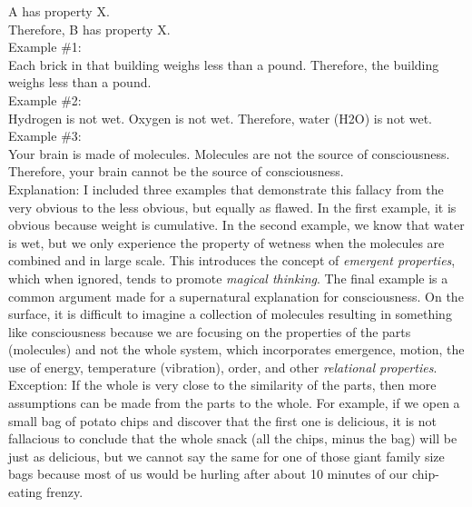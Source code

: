 \documentclass[a4paper,12pt,single,pdftex]{scrartcl}
\begin{document}
    
      A has property X.
    \\

    
      Therefore, B has property X.
    \\

    
      Example \#1:
    \\

    
      Each brick in that building weighs less than a pound.  Therefore, the building weighs less than a pound.
    \\

    
      Example \#2:
    \\

    
      Hydrogen is not wet.  Oxygen is not wet.  Therefore, water (H2O) is not wet.
    \\

    
      Example \#3:
    \\

    
      Your brain is made of molecules.  Molecules are not the source of consciousness.  Therefore, your brain cannot be the source of consciousness.
    \\

    
      Explanation: I included three examples that demonstrate this fallacy from the very obvious to the less obvious, but equally as flawed.  In the first example, it is obvious because weight is cumulative.  In the second example, we know that water is wet, but we only experience the property of wetness when the molecules are combined and in large scale.  This introduces the concept of {\it emergent properties}, which when ignored, tends to promote {\it magical thinking}.  The final example is a common argument made for a supernatural explanation for consciousness.  On the surface, it is difficult to imagine a collection of molecules resulting in something like consciousness because we are focusing on the properties of the parts (molecules) and not the whole system, which incorporates emergence, motion, the use of energy, temperature (vibration), order, and other {\it relational properties}.
    \\

    
      Exception: If the whole is very close to the similarity of the parts, then more assumptions can be made from the parts to the whole.  For example, if we open a small bag of potato chips and discover that the first one is delicious, it is not fallacious to conclude that the whole snack (all the chips, minus the bag) will be just as delicious, but we cannot say the same for one of those giant family size bags because most of us would be hurling after about 10 minutes of our chip-eating frenzy.
    \\
\end{document}
